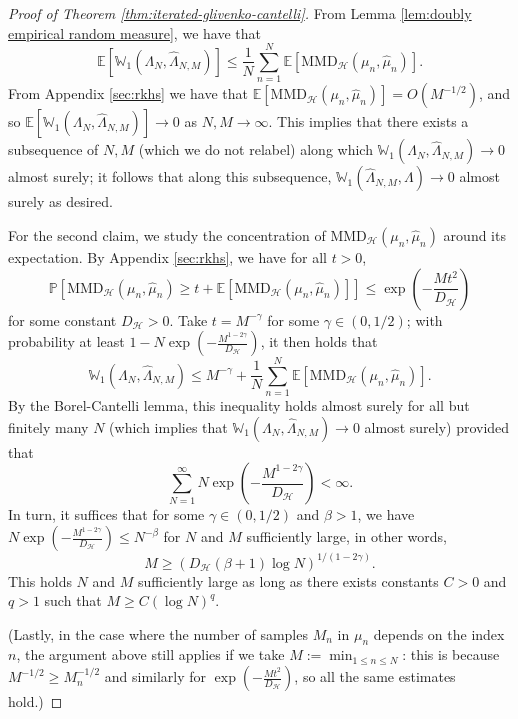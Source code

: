 \documentclass[aos, preprint]{imsart}
\theoremstyle{plain}
\theoremstyle{remark}
\begin{document}
\begin{appendix}
\begin{proof}[Proof of Theorem \ref{thm:iterated-glivenko-cantelli}]
From Lemma \ref{lem:doubly empirical random measure}, we have that
\[
\mathbb{E}\left[\mathbb{W}_{1}(\Lambda_{N},\hat{\Lambda}_{N,M})\right]\leq\frac{1}{N}\sum_{n=1}^{N}\mathbb{E}\left[\text{MMD}_{\mathcal{H}}(\mu_{n},\hat{\mu}_{n})\right].
\]
From Appendix \ref{sec:rkhs} we have that $\mathbb{E}\left[\text{MMD}_{\mathcal{H}}(\mu_{n},\hat{\mu}_{n})\right]=O(M^{-1/2})$,
and so $\mathbb{E}\left[\mathbb{W}_{1}(\Lambda_{N},\hat{\Lambda}_{N,M})\right]\rightarrow0$
as $N,M\rightarrow\infty$. This implies that there exists a subsequence
of $N,M$ (which we do not relabel) along which $\mathbb{W}_{1}(\Lambda_{N},\hat{\Lambda}_{N,M})\rightarrow0$
almost surely; it follows that along this subsequence, $\mathbb{W}_{1}(\hat{\Lambda}_{N,M},\Lambda)\rightarrow0$
almost surely as desired.

For the second claim, we study the concentration of $\text{MMD}_{\mathcal{H}}(\mu_{n},\hat{\mu}_{n})$
around its expectation. By Appendix \ref{sec:rkhs}, we have for all
$t>0$,
\[
\mathbb{P}\left[\text{MMD}_{\mathcal{H}}(\mu_{n},\hat{\mu}_{n})\geq t+\mathbb{E}[\text{MMD}_{\mathcal{H}}(\mu_{n},\hat{\mu}_{n})]\right]\leq\exp\left(-\frac{Mt^{2}}{D_{\mathcal{H}}}\right)
\]
for some constant $D_{\mathcal{H}}>0$. Take $t=M^{-\gamma}$ for
some $\gamma\in(0,1/2)$; with probability at least $1-N\exp\left(-\frac{M^{1-2\gamma}}{D_{\mathcal{H}}}\right)$,
it then holds that
\[
\mathbb{W}_{1}(\Lambda_{N},\hat{\Lambda}_{N,M})\leq M^{-\gamma}+\frac{1}{N}\sum_{n=1}^{N}\mathbb{E}[\text{MMD}_{\mathcal{H}}(\mu_{n},\hat{\mu}_{n})].
\]
By the Borel-Cantelli lemma, this inequality holds almost surely for
all but finitely many $N$ (which implies that $\mathbb{W}_{1}(\Lambda_{N},\hat{\Lambda}_{N,M})\rightarrow0$
almost surely) provided that
\[
\sum_{N=1}^{\infty}N\exp\left(-\frac{M^{1-2\gamma}}{D_{\mathcal{H}}}\right)<\infty.
\]
In turn, it suffices that for some $\gamma\in(0,1/2)$ and $\beta>1$,
we have $N\exp\left(-\frac{M^{1-2\gamma}}{D_{\mathcal{H}}}\right)\leq N^{-\beta}$
for $N$ and $M$ sufficiently large, in other words,
\[
M\geq\left(D_{\mathcal{H}}(\beta+1)\log N\right)^{1/(1-2\gamma)}.
\]
This holds $N$ and $M$ sufficiently large as long as there exists
constants $C>0$ and $q>1$ such that $M\geq C(\log N)^{q}$.

(Lastly, in the case where the number of samples $M_n$ in $\mu_n$ depends on the index $n$, the argument above still applies if we take $M:=\min_{1\leq n \leq N}$: this is because $M^{-1/2}\geq M_n^{-1/2}$ and similarly for $\exp\left(-\frac{Mt^{2}}{D_{\mathcal{H}}}\right)$, so all the same estimates hold.)
\end{proof}


\end{appendix}
\end{document}

